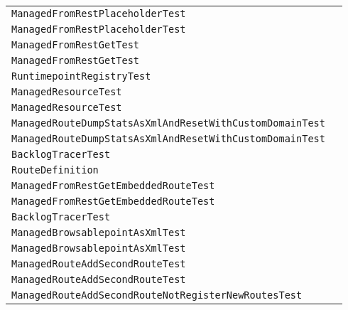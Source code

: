 \begin{center}
\begin{tabular}{ll}
\lstinline/ManagedFromRestPlaceholderTest/&\raisebox{0pt}{\lstinline/testFromRestModelPlaceholder()/}\\
\lstinline/ManagedFromRestPlaceholderTest/&\raisebox{0pt}{\lstinline/testFromRestModelPlaceholder()/}\\
\lstinline/ManagedFromRestGetTest/&\raisebox{0pt}{\lstinline/testFromRestModel()/}\\
\lstinline/ManagedFromRestGetTest/&\raisebox{0pt}{\lstinline/testFromRestModel()/}\\
\lstinline/RuntimepointRegistryTest/&\raisebox{0pt}{\lstinline/testRuntimepointRegistry()/}\\
\lstinline/ManagedResourceTest/&\raisebox{0pt}{\lstinline/ManagedResource()/}\\
\lstinline/ManagedResourceTest/&\raisebox{0pt}{\lstinline/ManagedResource()/}\\
\lstinline/ManagedRouteDumpStatsAsXmlAndResetWithCustomDomainTest/&\raisebox{0pt}{\lstinline/testPerformanceCounterStats()/}\\
\lstinline/ManagedRouteDumpStatsAsXmlAndResetWithCustomDomainTest/&\raisebox{0pt}{\lstinline/testPerformanceCounterStats()/}\\
\lstinline/BacklogTracerTest/&\raisebox{0pt}{\lstinline/testBacklogTracerEventMessageAsXml()/}\\
\lstinline/RouteDefinition/&\raisebox{0pt}{\lstinline/routeDefinitionadviceWith(ModelCamelContextc,RouteBuilder)/}\\
\lstinline/ManagedFromRestGetEmbeddedRouteTest/&\raisebox{0pt}{\lstinline/testFromRestModel()/}\\
\lstinline/ManagedFromRestGetEmbeddedRouteTest/&\raisebox{0pt}{\lstinline/testFromRestModel()/}\\
\lstinline/BacklogTracerTest/&\raisebox{0pt}{\lstinline/testBacklogTracerEventMessageDumpAllAsXml()/}\\
\lstinline/ManagedBrowsablepointAsXmlTest/&\raisebox{0pt}{\lstinline/testBrowseablepointAsXml()/}\\
\lstinline/ManagedBrowsablepointAsXmlTest/&\raisebox{0pt}{\lstinline/testBrowseablepointAsXml()/}\\
\lstinline/ManagedRouteAddSecondRouteTest/&\raisebox{0pt}{\lstinline/testRouteAddSecondRoute()/}\\
\lstinline/ManagedRouteAddSecondRouteTest/&\raisebox{0pt}{\lstinline/testRouteAddSecondRoute()/}\\
\lstinline/ManagedRouteAddSecondRouteNotRegisterNewRoutesTest/&\raisebox{0pt}{\lstinline/testRouteAddSecondRoute()/}\\

\end{tabular}
\end{center}
